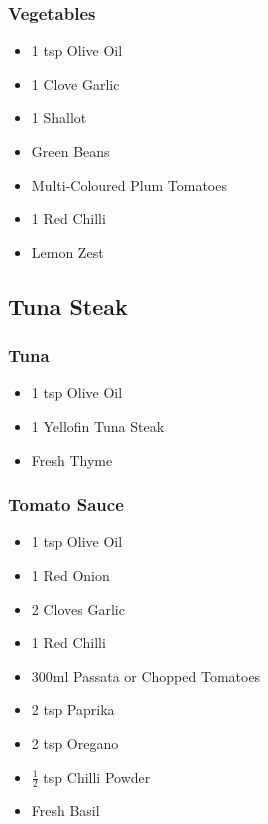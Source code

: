 \documentclass[11pt, english]{article}
\begin{document}
		\subsubsection*{Vegetables}

	\begin{itemize}
        \setlength\itemsep{0cm}
                \item 1 tsp Olive Oil
		\item 1 Clove Garlic
		\item 1 Shallot
		\item Green Beans
		\item Multi-Coloured Plum Tomatoes
		\item 1 Red Chilli
		\item Lemon Zest
        \end{itemize}

\newpage

	\subsection{Tuna Steak}

		\subsubsection*{Tuna}

	\begin{itemize}
        \setlength\itemsep{0cm}
                \item 1 tsp Olive Oil
		\item 1 Yellofin Tuna Steak
		\item Fresh Thyme
        \end{itemize}

		\subsubsection*{Tomato Sauce}

	\begin{itemize}
        \setlength\itemsep{0cm}
                \item 1 tsp Olive Oil
		\item 1 Red Onion
		\item 2 Cloves Garlic
		\item 1 Red Chilli
		\item 300ml Passata or Chopped Tomatoes
		\item 2 tsp Paprika
		\item 2 tsp Oregano
		\item $\frac{1}{2}$ tsp Chilli Powder
		\item Fresh Basil
        \end{itemize}
\end{document}
